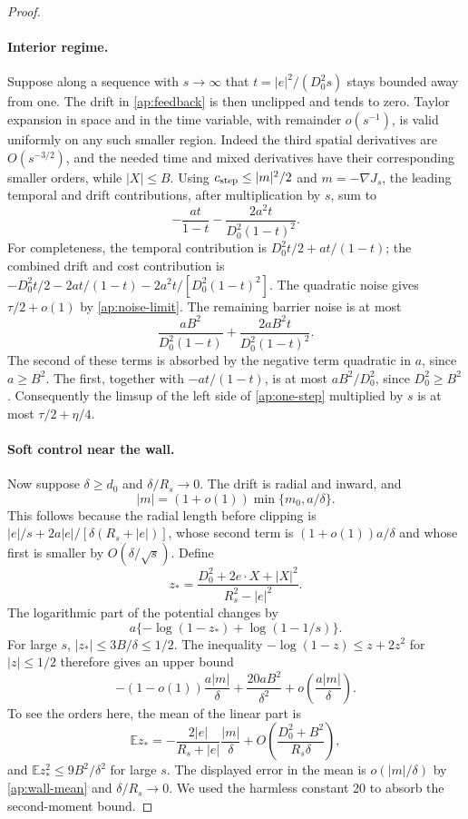 \documentclass[11pt]{article}
\numberwithin{equation}{section}
\theoremstyle{definition}
\theoremstyle{remark}
\newcommand{\E}{\mathbb E}
\begin{document}
\begin{proof}
\paragraph{Interior regime.}
Suppose along a sequence with \(s\to\infty\) that
\(t=|e|^2/(D_0^2s)\) stays bounded away from one.  The drift in
\eqref{ap:feedback} is then unclipped and tends to zero.  Taylor
expansion in space and in the time variable, with remainder \(o(s^{-1})\),
is valid uniformly on any such smaller region.  Indeed the third spatial
derivatives are \(O(s^{-3/2})\), and the needed time and mixed
derivatives have their corresponding smaller orders, while \(|X|\leq B\).
Using \(c_{\rm step}\leq |m|^2/2\) and \(m=-\nabla J_s\), the leading temporal
and drift contributions, after multiplication by \(s\), sum to
\[
 -\frac{at}{1-t}
 -\frac{2a^2t}{D_0^2(1-t)^2}.
\]
For completeness, the temporal contribution is
\(D_0^2t/2+at/(1-t)\); the combined drift and cost contribution is
\(-D_0^2t/2-2at/(1-t)-2a^2t/[D_0^2(1-t)^2]\).
The quadratic noise gives \(\tau/2+o(1)\) by
\eqref{ap:noise-limit}.  The remaining barrier noise is at most
\[
 \frac{aB^2}{D_0^2(1-t)}
 +\frac{2aB^2t}{D_0^2(1-t)^2}.
\]
The second of these terms is absorbed by the negative term quadratic
in \(a\), since \(a\geq B^2\).  The first, together with
\(-at/(1-t)\), is at most \(aB^2/D_0^2\), since \(D_0^2\geq B^2\).
Consequently the limsup of the left side of \eqref{ap:one-step}
multiplied by \(s\) is at most \(\tau/2+\eta/4\).

\paragraph{Soft control near the wall.}
Now suppose \(\delta\geq d_0\) and \(\delta/R_s\to0\).  The drift
is radial and inward, and
\begin{equation}\label{ap:wall-mean}
 |m|=(1+o(1))\min\{m_0,a/\delta\}.
\end{equation}
This follows because the radial length before clipping is
\(|e|/s+2a|e|/[\delta(R_s+|e|)]\), whose second term is
\((1+o(1))a/\delta\) and whose first is smaller by
\(O(\delta/\sqrt s)\).  Define
\[
 z_*=\frac{D_0^2+2e\cdot X+|X|^2}{R_s^2-|e|^2}.
\]
The logarithmic part of the potential changes by
\[
 a\{-\log(1-z_*)+\log(1-1/s)\}.
\]
For large \(s\), \(|z_*|\leq3B/\delta\leq1/2\).  The inequality
\(-\log(1-z)\leq z+2z^2\) for \(|z|\leq1/2\) therefore gives an
upper bound
\begin{equation}\label{ap:wall-barrier}
 -(1-o(1))\frac{a|m|}{\delta}
 +\frac{20aB^2}{\delta^2}
 +o\left(\frac{a|m|}{\delta}\right).
\end{equation}
To see the orders here, the mean of the linear part is
\[
 \E z_*
 =-\frac{2|e|}{R_s+|e|}\frac{|m|}{\delta}
   +O\left(\frac{D_0^2+B^2}{R_s\delta}\right),
\]
and \(\E z_*^2\leq9B^2/\delta^2\) for large \(s\).
The displayed error in the mean is
\(o(|m|/\delta)\) by \eqref{ap:wall-mean} and
\(\delta/R_s\to0\).  We used the harmless constant 20 to absorb
the second-moment bound.


\end{proof}
\end{document}
